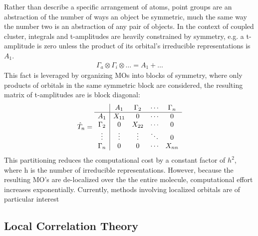 Rather than describe a specific arrangement of atoms, point groups are an abstraction of the number of ways an object be symmetric, much the same way the number two is an abstraction of any pair of objects. In the context of coupled cluster, integrals and t-amplitudes are heavily constrained by symmetry, e.g. a t-amplitude is zero unless the product of its orbital's irreducible representations is $A_1$.
\begin{align}
\Gamma_a \otimes \Gamma_i \otimes \dots  = A_1 + \dots
\end{align}
This fact is leveraged by organizing MOs into blocks of symmetry, where only products of orbitals in the same symmetric block are considered, the resulting matrix of t-amplitudes are is block diagonal:
\begin{equation*}
\hat{T}_{n}=\begin{array}{c| c c c c c}
&A_1 & \Gamma_2 & \cdots & \Gamma_n\\
\hline
A_1 & X_{11} &0 & \cdots & 0\\
\Gamma_2  & 0 & X_{22} &\cdots&0\\
\vdots & \vdots &\vdots & \ddots & 0\\
\Gamma_n & 0&0 & \cdots & X_{nn}
\end{array}\label{eq:diag}
\end{equation*}
This partitioning reduces the computational cost by a constant factor of $h^2$, where h is the number of irreducible representations. However, because the resulting MO's are de-localized over the the entire molecule, computational effort increases exponentially. Currently, methods involving localized orbitals are of particular interest 
\subsection{Local Correlation Theory}

